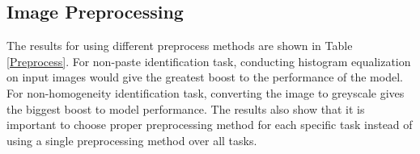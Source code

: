 \documentclass[pdflatex,sn-mathphys]{sn-jnl}%
\theoremstyle{thmstyleone}%
\theoremstyle{thmstyletwo}%
\theoremstyle{thmstylethree}%
\begin{document}
\subsection{Image Preprocessing}


\begin{table}[]
\caption{Comparison between different preprocess methods}\label{tabe}
\label{Preprocess}
\end{table}

The results for using different preprocess methods are shown in Table \ref{Preprocess}. For non-paste identification task, conducting histogram equalization on input images would give the greatest boost to the performance of the model. For non-homogeneity identification task, converting the image to greyscale gives the biggest boost to model performance. The results also show that it is important to choose proper preprocessing method for each specific task instead of using a single preprocessing method over all tasks.
\end{document}
